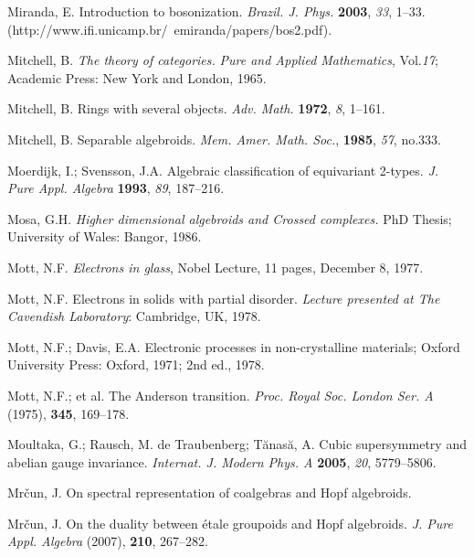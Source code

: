 \documentclass[12pt]{article}
\theoremstyle{plain}
\theoremstyle{definition}
\numberwithin{equation}{section}
\begin{document}
\begin{thebibliography}{99}
Miranda, E. Introduction to bosonization. {\em Brazil. J. Phys.} {\bf 2003}, {\em 33}, 1--33. (http://www.ifi.unicamp.br/~emiranda/papers/bos2.pdf).

Mitchell, B. {\em The theory of categories.} {\em Pure and Applied Mathematics}, Vol.{\em 17}; Academic Press: New York and London, 1965.

Mitchell, B. Rings with several objects. {\em Adv. Math.} {\bf 1972}, {\em 8}, 1--161.

Mitchell, B. Separable algebroids. {\em Mem. Amer. Math. Soc.}, {\bf 1985}, {\em 57}, no.333.

Moerdijk, I.; Svensson, J.A. Algebraic classification of equivariant 2-types. {\em J. Pure Appl. Algebra} {\bf 1993}, {\em 89}, 187--216.

Mosa, G.H. \emph{Higher dimensional algebroids and Crossed complexes.} PhD Thesis; University of Wales: Bangor, 1986.

Mott, N.F. \emph{Electrons in glass}, Nobel Lecture, 11 pages, December 8, 1977.

Mott, N.F. Electrons in solids with partial disorder. \emph{Lecture presented at The Cavendish Laboratory}: Cambridge, UK, 1978.

Mott, N.F.; Davis, E.A. {Electronic processes in non-crystalline materials}; Oxford University Press: Oxford, 1971; 2nd ed., 1978.

Mott, N.F.; et al. The Anderson transition. \emph{Proc. Royal Soc. London Ser. A} (1975), {\bf 345}, 169--178.

Moultaka, G.; Rausch, M. de Traubenberg; T\u{a}nas\u{a}, A. Cubic supersymmetry and abelian gauge invariance.
{\em Internat. J. Modern Phys. A} {\bf 2005}, {\em 20}, 5779--5806. %

Mr\v{c}un, J. On spectral representation of coalgebras and Hopf algebroids. %


Mr\v{c}un, J. On the duality between \'{e}tale groupoids and Hopf algebroids. \emph{J. Pure Appl. Algebra} (2007), {\bf 210}, 267--282.


\end{thebibliography}
\end{document}
